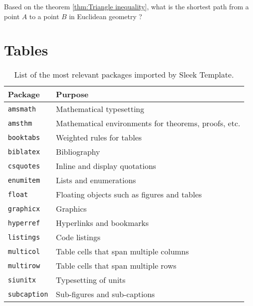 \documentclass[a4paper, 12pt]{report}
\begin{document}
    \begin{framedquest*}
        Based on the theorem \ref{thm:Triangle inequality}, what is the shortest path from a point $A$ to a point $B$ in Euclidean geometry ?
    \end{framedquest*}

    \newpage


    \printbibliography

    \appendix

    \chapter{Tables}

    \begin{table}[h]
        \centering
        \begin{tabular}{ll}
            \toprule
            \textbf{Package} & \textbf{Purpose} \\
            \midrule
            \texttt{amsmath} & Mathematical typesetting \\
            \texttt{amsthm} & Mathematical environments for theorems, proofs, etc. \\
            \texttt{booktabs} & Weighted rules for tables \\
            \texttt{biblatex} & Bibliography \\
            \texttt{csquotes} & Inline and display quotations \\
            \texttt{enumitem} & Lists and enumerations \\
            \texttt{float} & Floating objects such as figures and tables \\
            \texttt{graphicx} & Graphics \\
            \texttt{hyperref} & Hyperlinks and bookmarks \\
            \texttt{listings} & Code listings \\
            \texttt{multicol} & Table cells that span multiple columns \\
            \texttt{multirow} & Table cells that span multiple rows \\
            \texttt{siunitx} & Typesetting of units  \\
            \texttt{subcaption} & Sub-figures and sub-captions \\
            \bottomrule
        \end{tabular}
        \caption{List of the most relevant packages imported by Sleek Template.}
        \label{tab:sleek_relevant_packages}
    \end{table}
\end{document}
